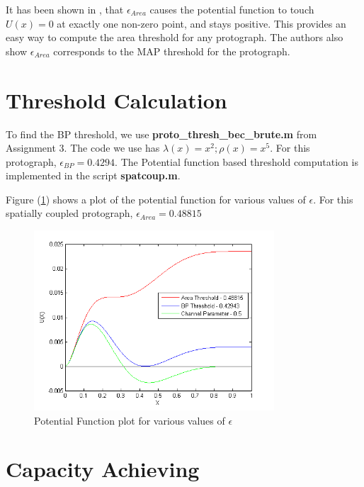 \documentclass[paper=a4, fontsize=12pt]{scrartcl} %
\numberwithin{equation}{section} %
\numberwithin{figure}{section} %
\numberwithin{table}{section} %
\begin{document}
It has been shown in \cite{EPFL}, that $\epsilon_{Area}$ causes the potential function to touch $U(x)=0$ at exactly one non-zero point, and stays positive. This provides an easy way to compute the area threshold for any protograph. The authors also show $\epsilon_{Area}$ corresponds to the MAP threshold for the protograph. 

\section{Threshold Calculation}

To find the BP threshold, we use \textbf{proto\_thresh\_bec\_brute.m} from Assignment 3. The code we use has $\lambda(x)=x^2; \rho(x)=x^5$. For this protograph, $\epsilon_{BP}=0.4294$. The Potential function based threshold computation is implemented in the script \textbf{spatcoup.m}.

Figure (\ref{spat}) shows a plot of the potential function for various values of $\epsilon$. For this spatially coupled protograph, $\epsilon_{Area}=0.48815$

\begin{figure}[h]
\centering
\includegraphics[width=0.8\textwidth]{images/spat}
\caption{Potential Function plot for various values of $\epsilon$}
\label{spat}
\end{figure}

\section{Capacity Achieving}
\end{document}
